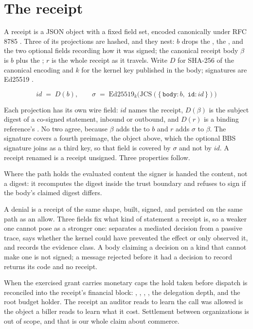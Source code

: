 \section{The receipt}
\label{sec:receipt}

A receipt is a JSON object with a fixed field set, encoded canonically under
RFC 8785 \cite{rfc8785}. Three of its projections are hashed, and they nest:
$b$ drops the , the , and the two optional fields
recording how it was signed; the canonical receipt body $\beta$ is $b$ plus the
; $r$ is the whole receipt as it travels. Write $D$ for SHA-256 of the
canonical encoding and $k$ for the kernel key published in the body; signatures
are Ed25519 \cite{rfc8032}.

\[
\mathit{id} \;=\; D(b),
\qquad
\sigma \;=\; \mathrm{Ed25519}_{k}\bigl(\mathrm{JCS}(\{\,\texttt{body}\!: b,\;
\texttt{id}\!: \mathit{id}\,\})\bigr)
\]

\noindent
Each projection has its own wire field: $\mathit{id}$ names the receipt,
$D(\beta)$ is the subject digest of a co-signed statement, inbound or outbound,
and $D(r)$ is a binding reference's . No two agree,
because $\beta$ adds the  to $b$ and $r$ adds $\sigma$ to $\beta$. The
signature covers a fourth preimage, the object above, which the optional BBS
signature joins as a third key, so that field is covered by $\sigma$ and not by
$\mathit{id}$. A receipt renamed is a receipt unsigned.
Three properties follow.

 Where the path holds the evaluated content the
signer is handed the content, not a digest: it recomputes the digest inside the
trust boundary and refuses to sign if the body's claimed digest differs.

 A denial is a receipt of the same shape, built,
signed, and persisted on the same path as an allow. Three fields fix what kind
of statement a receipt is, so a weaker one cannot pose as a stronger one:
 separates a mediated decision from a passive trace,
 says whether the kernel could have prevented the effect or
only observed it, and  records the evidence class. A body
claiming a decision on a kind that cannot make one is not signed; a message
rejected before it had a decision to record returns its code and no receipt.

 When the exercised grant
carries monetary caps the hold taken before dispatch is reconciled into the
receipt's financial block: , ,
, , the delegation depth, and the root
budget holder. The receipt an auditor reads to learn the call was allowed is the
object a biller reads to learn what it cost. Settlement between organizations is
out of scope, and that is our whole claim about commerce.

